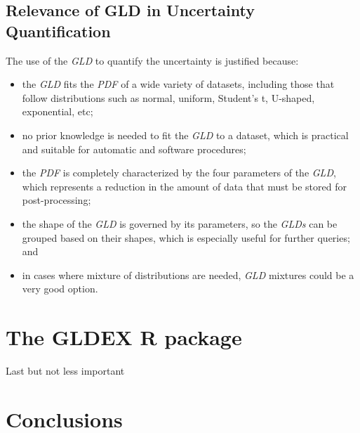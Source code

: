 \subsection{Relevance of GLD in Uncertainty Quantification}
The use of the \textit{GLD} to quantify the uncertainty is justified because: 
\begin{itemize}
\item the \textit{GLD} fits the \textit{PDF} of a wide variety of datasets, including those that follow distributions such as normal, uniform, Student's t, U-shaped, exponential, etc;
\item no prior knowledge is needed to fit the \textit{GLD} to a dataset, which is practical and suitable for automatic and software procedures;
\item the \textit{PDF} is completely characterized by the four parameters of the \textit{GLD}, which represents a reduction in the amount of data that must be stored for post-processing;
\item the shape of the \textit{GLD} is governed by its parameters, so the \textit{GLDs} can be grouped  based on their shapes, which is especially useful for further queries; and
\item in cases where mixture of distributions are needed, \textit{GLD} mixtures could be a very good option.
\end{itemize}
\cite{Ning2008} 

\section{The GLDEX R package}\label{sec:gldex}
Last but not less important 

\section{Conclusions}

